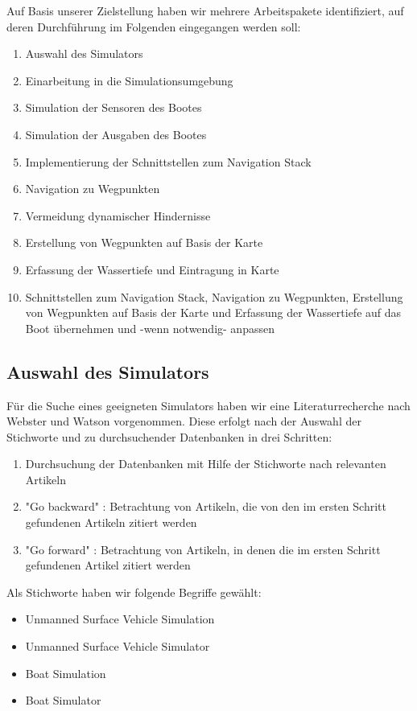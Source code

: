 \documentclass[11pt]{article}
\begin{document}
Auf Basis unserer Zielstellung haben wir mehrere Arbeitspakete identifiziert, auf deren Durchführung im Folgenden eingegangen werden soll:
\begin{enumerate}
	\item Auswahl des Simulators
	\item Einarbeitung in die Simulationsumgebung
	\item Simulation der Sensoren des Bootes
	\item Simulation der Ausgaben des Bootes
	\item Implementierung der Schnittstellen zum Navigation Stack
	\item Navigation zu Wegpunkten
	\item Vermeidung dynamischer Hindernisse
	\item Erstellung von Wegpunkten auf Basis der Karte
	\item Erfassung der Wassertiefe und Eintragung in Karte
	\item Schnittstellen zum Navigation Stack, Navigation zu Wegpunkten, Erstellung von Wegpunkten auf Basis der Karte und Erfassung der Wassertiefe auf das Boot übernehmen und -wenn notwendig- anpassen
\end{enumerate}

\subsection{Auswahl des Simulators}

Für die Suche eines geeigneten Simulators haben wir eine Literaturrecherche nach Webster und Watson \cite{webster2002} vorgenommen. Diese erfolgt nach der Auswahl der Stichworte und zu durchsuchender Datenbanken in drei Schritten:

\begin{enumerate}
	\item Durchsuchung der Datenbanken mit Hilfe der Stichworte nach relevanten Artikeln
	\item "Go backward" \cite{webster2002}: Betrachtung von Artikeln, die von den im ersten Schritt gefundenen Artikeln zitiert werden
	\item "Go forward" \cite{webster2002}: Betrachtung von Artikeln, in denen die im ersten Schritt gefundenen Artikel zitiert werden
\end{enumerate}

Als Stichworte haben wir folgende Begriffe gewählt:

\begin{itemize}
	\item Unmanned Surface Vehicle Simulation
	\item Unmanned Surface Vehicle Simulator
	\item Boat Simulation
	\item Boat Simulator
\end{itemize}
\end{document}
